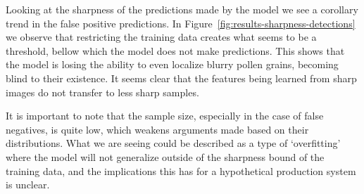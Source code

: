 Looking at the sharpness of the predictions made by the model we see a corollary trend in the false positive predictions.
In Figure~\ref{fig:results-sharpness-detections} we observe that restricting the training data creates what seems to be a threshold, bellow which the model does not make predictions.
This shows that the model is losing the ability to even localize blurry pollen grains, becoming blind to their existence.
It seems clear that the features being learned from sharp images do not transfer to less sharp samples.

It is important to note that the sample size, especially in the case of false negatives, is quite low, which weakens arguments made based on their distributions.
What we are seeing could be described as a type of `overfitting' where the model will not generalize outside of the sharpness bound of the training data, and the implications this has for a hypothetical production system is unclear.

